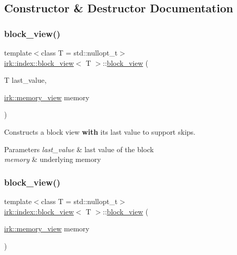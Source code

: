\subsection{Constructor \& Destructor Documentation}
\mbox{\label{classirk_1_1index_1_1block__view_ac42c1a26fd05c0f53f91cc51cc090e75}} 
\subsubsection{\texorpdfstring{block\+\_\+view()}{block\_view()}\hspace{0.1cm}{\footnotesize\ttfamily [1/2]}}
{\footnotesize\ttfamily template$<$class T  = std\+::nullopt\+\_\+t$>$ \\
\mbox{\hyperlink{classirk_1_1index_1_1block__view}{irk\+::index\+::block\+\_\+view}}$<$ T $>$\+::\mbox{\hyperlink{classirk_1_1index_1_1block__view}{block\+\_\+view}} (\begin{DoxyParamCaption}\item[{T}]{last\+\_\+value,  }\item[{\mbox{\hyperlink{classirk_1_1memory__view}{irk\+::memory\+\_\+view}}}]{memory }\end{DoxyParamCaption})\hspace{0.3cm}{\ttfamily [inline]}}

Constructs a block view {\bfseries with} its last value to support skips. 
\begin{DoxyParams}{Parameters}
{\em last\+\_\+value} & last value of the block \\
\hline
{\em memory} & underlying memory \\
\hline
\end{DoxyParams}
\mbox{\label{classirk_1_1index_1_1block__view_aebe22ab369a7a62a205f2b3e4196cc3d}} 
\subsubsection{\texorpdfstring{block\+\_\+view()}{block\_view()}\hspace{0.1cm}{\footnotesize\ttfamily [2/2]}}
{\footnotesize\ttfamily template$<$class T  = std\+::nullopt\+\_\+t$>$ \\
\mbox{\hyperlink{classirk_1_1index_1_1block__view}{irk\+::index\+::block\+\_\+view}}$<$ T $>$\+::\mbox{\hyperlink{classirk_1_1index_1_1block__view}{block\+\_\+view}} (\begin{DoxyParamCaption}\item[{\mbox{\hyperlink{classirk_1_1memory__view}{irk\+::memory\+\_\+view}}}]{memory }\end{DoxyParamCaption})\hspace{0.3cm}{\ttfamily [inline]}}


